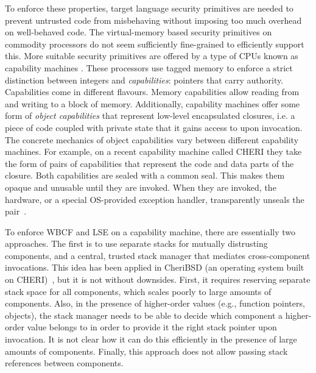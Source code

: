 \documentclass{jfp}
\begin{document}
To enforce these properties, target language security primitives are needed to prevent untrusted code from misbehaving without imposing too much overhead on well-behaved code.
The virtual-memory based security primitives on commodity processors do not seem sufficiently fine-grained to efficiently support this.
More suitable security primitives are offered by a type of CPUs known as capability machines \citep{levy_capability-based_1984,watson_cheri_2015}.
These processors use tagged memory to enforce a strict distinction between integers and {\itshape capabilities}: pointers that carry authority.
Capabilities come in different flavours.
Memory capabilities allow reading from and writing to a block of memory.
Additionally, capability machines offer some form of {\itshape object capabilities} that represent low-level encapsulated closures, i.e. a piece of code coupled with private state that it gains access to upon invocation.
The concrete mechanics of object capabilities vary between different capability machines.
For example, on a recent capability machine called CHERI they take the form of pairs of capabilities that represent the code and data parts of the closure.
Both capabilities are sealed with a common seal.
This makes them opaque and unusable until they are invoked.
When they are invoked, the hardware, or a special OS-provided exception handler, transparently unseals the pair~\citep{watson_capability_2015,watson_fast_2016}.

To enforce WBCF and LSE on a capability machine, there are essentially two approaches.
The first is to use separate stacks for mutually distrusting components, and a central, trusted stack manager that mediates cross-component invocations.
This idea has been applied in CheriBSD (an operating system built on CHERI)~\citep{watson_capability_2015}, but it is not without downsides.
First, it requires reserving separate stack space for all components, which scales poorly to large amounts of components.
Also, in the presence of higher-order values (e.g., function pointers, objects), the stack manager needs to be able to decide which component a higher-order value belongs to in order to provide it the right stack pointer upon invocation.
It is not clear how it can do this efficiently in the presence of large amounts of components.
Finally, this approach does not allow passing stack references between components.
\end{document}
